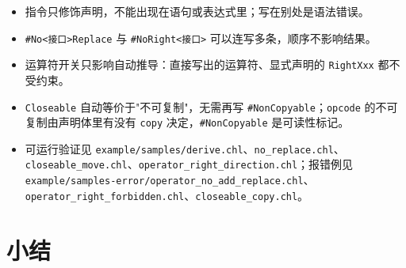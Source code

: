 \begin{itemize}

\item 指令只修饰声明，不能出现在语句或表达式里；写在别处是语法错误。

\item \texttt{\#No<\allowbreak{}接口>\allowbreak{}Replace} 与 \texttt{\#No\allowbreak{}Right<\allowbreak{}接口>\allowbreak{}} 可以连写多条，顺序不影响结果。

\item 运算符开关只影响自动推导：直接写出的运算符、显式声明的 \texttt{Right\allowbreak{}Xxx} 都不受约束。

\item \texttt{Closeable} 自动等价于"不可复制"，无需再写 \texttt{\#Non\allowbreak{}Copyable}；\texttt{opcode} 的不可复制由声明体里有没有 \texttt{copy} 决定，\texttt{\#Non\allowbreak{}Copyable} 是可读性标记。

\item 可运行验证见 \texttt{example/\allowbreak{}samples/\allowbreak{}derive.\allowbreak{}chl}、\texttt{no\_replace.\allowbreak{}chl}、\texttt{closeable\_move.\allowbreak{}chl}、\texttt{operator\_right\_direction.\allowbreak{}chl}；报错例见 \texttt{example/\allowbreak{}samples-error/\allowbreak{}operator\_no\_add\_replace.\allowbreak{}chl}、\texttt{operator\_right\_forbidden.\allowbreak{}chl}、\texttt{closeable\_copy.\allowbreak{}chl}。

\end{itemize}

\section{小结}

